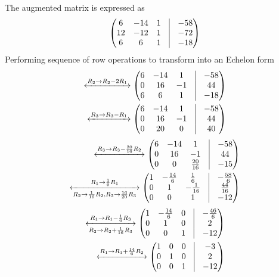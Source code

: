 \documentclass[12pt]{article}
\newcommand{\myvec}[1]{\ensuremath{\begin{pmatrix}#1\end{pmatrix}}}
\begin{document}
\begin{enumerate}
The augmented matrix is expressed as
\begin{align}
	\myvec{6 & -14 & 1 & \vrule & -58 \\ 
	      12 & -12 & 1 & \vrule & -72 \\
	       6 &  6  & 1 & \vrule & -18 
	     }  
\end{align}
Performing sequence of row operations to transform into an Echelon form
\begin{align}
	\xleftrightarrow[]{{R_2\rightarrow R_2-2R_1}}  
	\myvec{6 & -14 & 1 & \vrule & -58 \\ 
	       0 &  16 & -1 & \vrule & 44 \\
	       6 &  6  & 1 & \vrule & -18 
	     }  \\ 
	\xleftrightarrow[]{{R_3\rightarrow R_3-R_1}}  
	\myvec{6 & -14 & 1 & \vrule & -58 \\ 
	       0 &  16 & -1 & \vrule & 44 \\
	       0 &  20  & 0 & \vrule & 40 
	     }  
\end{align}
\begin{align}
	\xleftrightarrow[]{{R_3\rightarrow R_3-\frac{20}{16}R_2}}  
	\myvec{6 & -14 & 1 & \vrule & -58 \\ 
	       0 &  16 & -1 & \vrule & 44 \\
	       0 &  0  &  \frac{20}{16} & \vrule & -15 
	     }  \\ 
	\xleftrightarrow[R_2\rightarrow \frac{1}{16}R_2 \text{,} R_3\rightarrow \frac{16}{20}R_3]{{R_1\rightarrow \frac{1}{6}R_1}}  
	\myvec{1 & -\frac{14}{6} & \frac{1}{6} & \vrule & -\frac{58}{6} \\ 
	       0 &  1 & -\frac{1}{16} & \vrule & \frac{44}{16} \\
	       0 &  0  &  1  & \vrule & -12 
	     }   
\end{align}
\begin{align}
	\xleftrightarrow[R_2\rightarrow R_2+\frac{1}{16}R_3]{{R_1\rightarrow R_1-\frac{1}{6}R_3}}  
	\myvec{1 & -\frac{14}{6} & 0 & \vrule & -\frac{46}{6} \\ 
	       0 &  1 & 0 & \vrule & 2 \\
	       0 &  0  &  1  & \vrule & -12 
	     }  \\ 
	\label{eq:Solution}
	\xleftrightarrow[]{{R_1\rightarrow R_1+\frac{14}{6}R_2}}  
	\myvec{1 &  0 & 0 & \vrule & -3\\ 
	       0 &  1 & 0 & \vrule & 2 \\
	       0 &  0 & 1 & \vrule & -12 
	     }  \\ 

\end{align}
\end{enumerate}
\end{document}
